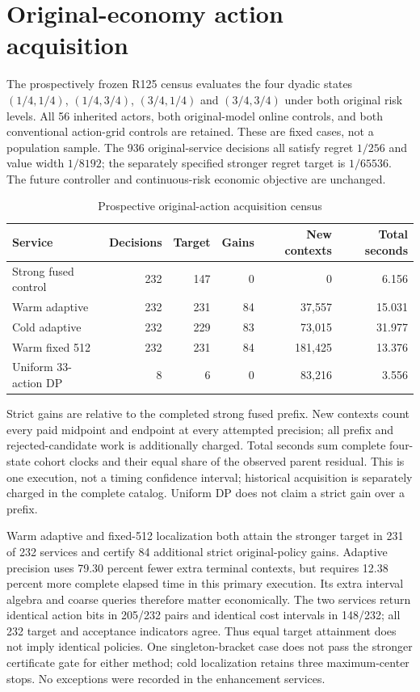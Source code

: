 \section{Original-economy action acquisition}
\label{sec:results125}
The prospectively frozen R125 census evaluates the four dyadic states $(1/4,1/4)$, $(1/4,3/4)$, $(3/4,1/4)$ and $(3/4,3/4)$ under both original risk levels. All 56 inherited actors, both original-model online controls, and both conventional action-grid controls are retained. These are fixed cases, not a population sample. The 936 original-service decisions all satisfy regret $1/256$ and value width $1/8192$; the separately specified stronger regret target is $1/65536$. The future controller and continuous-risk economic objective are unchanged.
\begin{table}[t]
\centering\small
\caption{Prospective original-action acquisition census}
\label{tab:acquisition125}
\begin{tabular}{lrrrrr}
\hline
Service & Decisions & Target & Gains & New contexts & Total seconds \\
\hline
Strong fused control & 232 & 147 & 0 & 0 & 6.156 \\
Warm adaptive & 232 & 231 & 84 & 37,557 & 15.031 \\
Cold adaptive & 232 & 229 & 83 & 73,015 & 31.977 \\
Warm fixed 512 & 232 & 231 & 84 & 181,425 & 13.376 \\
Uniform 33-action DP & 8 & 6 & 0 & 83,216 & 3.556 \\
\hline
\end{tabular}
\par\smallskip\parbox{0.96\textwidth}{\footnotesize Strict gains are relative to the completed strong fused prefix. New contexts count every paid midpoint and endpoint at every attempted precision; all prefix and rejected-candidate work is additionally charged. Total seconds sum complete four-state cohort clocks and their equal share of the observed parent residual. This is one execution, not a timing confidence interval; historical acquisition is separately charged in the complete catalog. Uniform DP does not claim a strict gain over a prefix.}
\end{table}
Warm adaptive and fixed-512 localization both attain the stronger target in 231 of 232 services and certify 84 additional strict original-policy gains. Adaptive precision uses 79.30 percent fewer extra terminal contexts, but requires 12.38 percent more complete elapsed time in this primary execution. Its extra interval algebra and coarse queries therefore matter economically. The two services return identical action bits in 205/232 pairs and identical cost intervals in 148/232; all 232 target and acceptance indicators agree. Thus equal target attainment does not imply identical policies. One singleton-bracket case does not pass the stronger certificate gate for either method; cold localization retains three maximum-center stops. No exceptions were recorded in the enhancement services.
